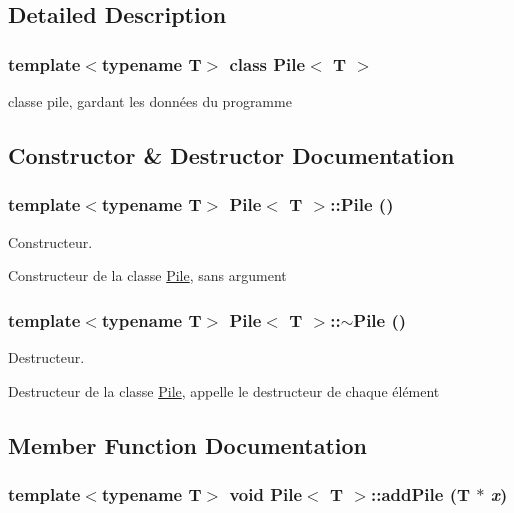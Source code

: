 \subsection{Detailed Description}
\subsubsection*{template$<$typename T$>$ class Pile$<$ T $>$}

classe pile, gardant les données du programme 

\subsection{Constructor \& Destructor Documentation}
\hypertarget{classPile_a6393ea69d41a484a63f691bef44469a7}{
\subsubsection[{Pile}]{\setlength{\rightskip}{0pt plus 5cm}template$<$typename T$>$ {\bf Pile}$<$ T $>$::{\bf Pile} ()}}
\label{classPile_a6393ea69d41a484a63f691bef44469a7}


Constructeur. 

Constructeur de la classe \hyperlink{classPile}{Pile}, sans argument \hypertarget{classPile_ac10aba315bae705a7821c41d5d31e11c}{
\subsubsection[{$\sim$Pile}]{\setlength{\rightskip}{0pt plus 5cm}template$<$typename T$>$ {\bf Pile}$<$ T $>$::$\sim${\bf Pile} ()}}
\label{classPile_ac10aba315bae705a7821c41d5d31e11c}


Destructeur. 

Destructeur de la classe \hyperlink{classPile}{Pile}, appelle le destructeur de chaque élément 

\subsection{Member Function Documentation}
\hypertarget{classPile_a5e80dbc7bc37bb4cc6439a2299bb2327}{
\subsubsection[{addPile}]{\setlength{\rightskip}{0pt plus 5cm}template$<$typename T$>$ void {\bf Pile}$<$ T $>$::addPile (T $\ast$ {\em x})}}
\label{classPile_a5e80dbc7bc37bb4cc6439a2299bb2327}


